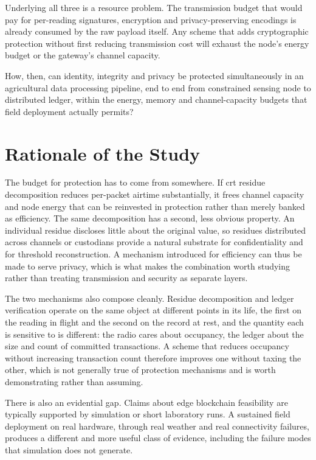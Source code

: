 \documentclass[12pt,a4paper,oneside]{book}
\begin{document}
Underlying all three is a resource problem. The transmission budget that would
pay for per-reading signatures, encryption and privacy-preserving encodings is
already consumed by the raw payload itself. Any scheme that adds cryptographic
protection without first reducing transmission cost will exhaust the node's
energy budget or the gateway's channel capacity.

How, then, can identity, integrity and privacy be protected simultaneously in an agricultural data
processing pipeline, end to end from constrained sensing node to distributed
ledger, within the energy, memory and channel-capacity budgets that field
deployment actually permits?

\section{Rationale of the Study}
\label{sec:rationale}

The budget for protection has to come from somewhere. If
\gls{crt} residue decomposition reduces per-packet airtime substantially, it
frees channel capacity and node energy that can be reinvested in protection
rather than merely banked as efficiency. The same decomposition has a second,
less obvious property. An individual residue discloses little about the original
value, so residues distributed across channels or custodians provide a natural
substrate for confidentiality and for threshold reconstruction. A mechanism
introduced for efficiency can thus be made to serve privacy, which is what makes
the combination worth studying rather than treating transmission and security as
separate layers.

The two mechanisms also compose cleanly. Residue
decomposition and ledger verification operate on the same object at different
points in its life, the first on the reading in flight and the second on the
record at rest, and the quantity each is sensitive to is different: the radio
cares about occupancy, the ledger about the size and count of committed
transactions. A scheme that reduces occupancy without increasing transaction
count therefore improves one without taxing the other, which is not generally
true of protection mechanisms and is worth demonstrating rather than assuming.

There is also an evidential gap. Claims about edge blockchain feasibility are
typically supported by simulation or short laboratory runs. A
sustained field deployment on real hardware, through real weather and real
connectivity failures, produces a different and more useful class of evidence,
including the failure modes that simulation does not generate.
\end{document}
